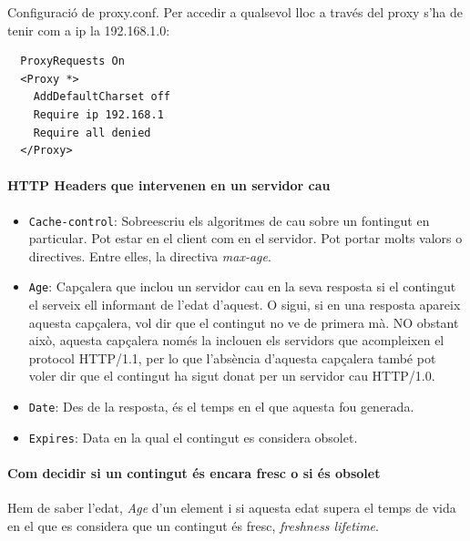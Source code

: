 \documentclass[a4paper, 11pt]{article}
\begin{document}
Configuració de proxy.conf. Per accedir a qualsevol lloc a trav\'es del proxy s'ha de tenir com a ip la 192.168.1.0:

\begin{verbatim}
  ProxyRequests On
  <Proxy *>
    AddDefaultCharset off
    Require ip 192.168.1
    Require all denied
  </Proxy>
\end{verbatim}

\paragraph{HTTP Headers que intervenen en un servidor cau}

\begin{itemize}
	\item \verb+Cache-control+: Sobreescriu els algoritmes de cau sobre un fontingut en particular. Pot estar en el client com en el servidor. Pot portar molts valors o directives. Entre elles, la directiva \textit{max-age}.
	\item \verb+Age+: Capçalera que inclou un servidor cau en la seva resposta si el contingut el serveix ell informant de l'edat d'aquest. O sigui, si en una resposta apareix aquesta capçalera, vol dir que el contingut no ve de primera mà. NO obstant això, aquesta capçalera nom\'es la inclouen els servidors que acompleixen el protocol HTTP/1.1, per lo que l'absència d'aquesta capçalera tamb\'e pot voler dir que el contingut ha sigut donat per un servidor cau HTTP/1.0.
	\item \verb+Date+: Des de la resposta, \'es el temps en el que aquesta fou generada.
	\item \verb+Expires+: Data en la qual el contingut es considera obsolet.
\end{itemize}

\paragraph{Com decidir si un contingut \'es encara fresc o si \'es obsolet \\}

Hem de saber l'edat, \textit{Age} d'un element i si aquesta edat supera el temps de vida en el que es considera que un contingut \'es fresc, \textit{freshness lifetime}.
\end{document}
